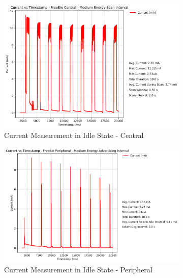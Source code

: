 \begin{figure}[H]
    \begin{subfigure}{0.5\linewidth}
        \centering
        \includegraphics[width=0.8\linewidth]{chapters/Results/Current vs Timestamp - FreeBie Central Medium.png}
        \caption{Current Measurement in Idle State - Central}
        \label{fig:freebie_medium_central}
    \end{subfigure}
    \begin{subfigure}{0.5\linewidth}
        \centering
        \includegraphics[width=0.8\linewidth]{chapters/Results/Current vs Timestamp - FreeBie Peripheral Medium.png}
        \caption{Current Measurement in Idle State - Peripheral}
        \label{fig:freebie_medium_peripheral}
    \end{subfigure}
    \begin{center}
        \begin{subfigure}{0.5\linewidth}
            \centering

\end{subfigure}
\end{center}
\end{figure}
